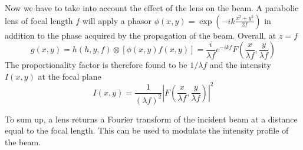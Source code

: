 Now we have to take into account the effect of the lens on the beam. A parabolic lens of focal length $f$ will apply a phasor $\phi(x,y) = \exp(-ik\frac{x^2+y^2}{2f})$ in addition to the phase acquired by the propagation of the beam. Overall, at $z=f$
\begin{equation}
    g(x,y) = h(h,y,f) \otimes \left[ \phi(x,y) f(x,y) \right]
    = \frac{i}{\lambda f} e^{-ikf} F\left(\frac{x}{\lambda f}, \frac{y}{\lambda f}\right)
\end{equation}
The proportionality factor is therefore found to be $1/\lambda f$
and the intensity $I(x,y)$ at the focal plane
\begin{equation}
    I(x,y) = \frac{1}{(\lambda f)^2} \left| F\left(\frac{x}{\lambda f}, \frac{y}{\lambda f}\right) \right|^2
\end{equation}

To sum up, a lens returns a Fourier transform of the incident beam at a distance equal to the focal length. This can be used to modulate the intensity profile of the beam.

